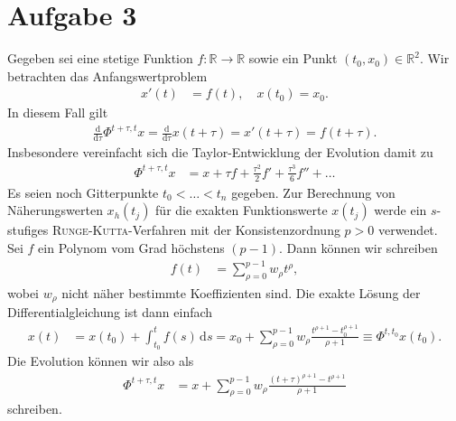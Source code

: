 \documentclass[english, parskip=full]{scrartcl}
\newcommand{\intx}{}
\newcommand{\tecxt}{}
\begin{document}
\section*{Aufgabe 3}
Gegeben sei eine stetige Funktion $f : \mathbb{R} \rightarrow \mathbb{R}$ sowie ein Punkt $(t_0,x_0) \in \mathbb{R}^2$.
Wir betrachten das Anfangswertproblem 
\begin{align}
x'(t) &= f(t), \quad x(t_0) = x_0.
\end{align}
In diesem Fall gilt
\begin{align}
\frac{\tecxt\text{d}}{\tecxt\text{d}\tau} \Phi^{t+\tau,t}x = \frac{\tecxt\text{d}}{\tecxt\text{d}\tau} x(t+\tau) = x'(t+\tau) = f(t+\tau).
\end{align}
Insbesondere vereinfacht sich die Taylor-Entwicklung der Evolution damit zu
\begin{align}
\Phi^{t+\tau,t} x &= x + \tau  f + \frac{\tau^2}{2} f' + \frac{\tau^3}{6} f'' + \dots
\end{align}
Es seien noch Gitterpunkte $t_0 < \dots < t_n$ gegeben.
Zur Berechnung von Näherungswerten $x_h(t_j)$ für die exakten Funktionswerte $x(t_j)$ werde ein $s$-stufiges \textsc{Runge-Kutta}-Verfahren mit der Konsistenzordnung $p>0$ verwendet.
\\
Sei $f$ ein Polynom vom Grad höchstens $(p-1)$.
Dann können wir schreiben
\begin{align}
f(t) &= \sum_{\rho=0}^{p-1} w_\rho t^\rho,
\end{align}
wobei $w_\rho$ nicht näher bestimmte Koeffizienten sind.
Die exakte Lösung der Differentialgleichung ist dann einfach
\begin{align}
x(t) &= x(t_0) + \intx\int_{t_0}^{t} f(s)\, \mathrm{d}s = x_0 + \sum_{\rho=0}^{p-1} w_\rho \frac{t^{\rho + 1} - t_0^{\rho + 1}}{\rho + 1} \equiv \Phi^{t,t_0}x(t_0).
\end{align}
Die Evolution können wir also als
\begin{align}
\Phi^{t+\tau,t}x &= x + \sum_{\rho=0}^{p-1} w_\rho \frac{(t+\tau)^{\rho + 1} - t^{\rho + 1}}{\rho + 1}
\end{align}
schreiben.
\end{document}

